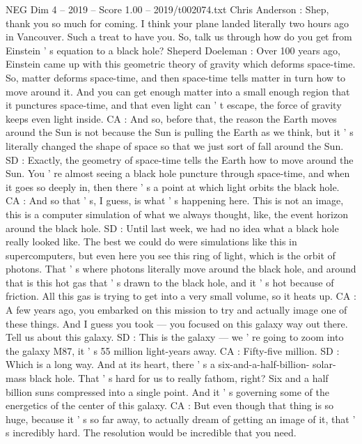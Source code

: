 \begin{textsample}{NEG Dim 4 – 2019 – Score 1.00 – 2019/t002074.txt}  \label{ex:f4_neg_033}
Chris Anderson : Shep, thank you so much for coming.
I think your plane landed literally two hours ago in Vancouver.
Such a treat to have you.
So, talk us through how do you get from Einstein ' s equation to a black hole?
Sheperd Doeleman : Over 100 years ago, Einstein came up with this geometric theory of gravity which deforms space-time.
So, matter deforms space-time, and then space-time tells matter in turn how to move around it.
And you can get enough matter into a small enough region that it punctures space-time, and that even light can ' t escape, the force of gravity keeps even light inside.
CA : And so, before that, the reason the Earth moves around the Sun is not because the Sun is pulling the Earth as we think, but it ' s literally changed the shape of space so that we just sort of fall around the Sun.
SD : Exactly, the geometry of space-time tells the Earth how to move around the Sun.
You ' re almost seeing a black hole puncture through space-time, and when it goes so deeply in, then there ' s a point at which light orbits the black hole.
CA : And so that ' s, I guess, is what ' s happening here.
This is not an image, this is a computer simulation of what we always thought, like, the event horizon around the black hole.
SD : Until last week, we had no idea what a black hole really looked like.
The best we could do were simulations like this in supercomputers, but even here you see this ring of light, which is the orbit of photons.
That ' s where photons literally move around the black hole, and around that is this hot gas that ' s drawn to the black hole, and it ' s hot because of friction.
All this gas is trying to get into a very small volume, so it heats up.
CA : A few years ago, you embarked on this mission to try and actually image one of these things.
And I guess you took — you focused on this galaxy way out there.
Tell us about this galaxy.
SD : This is the galaxy — we ' re going to zoom into the galaxy M87, it ' s 55 million light-years away.
CA : Fifty-five million.
SD : Which is a long way.
And at its heart, there ' s a six-and-a-half-billion- solar-mass black hole.
That ' s hard for us to really fathom, right?
Six and a half billion suns compressed into a single point.
And it ' s governing some of the energetics of the center of this galaxy.
CA : But even though that thing is so huge, because it ' s so far away, to actually dream of getting an image of it, that ' s incredibly hard.
The resolution would be incredible that you need.

\end{textsample}
